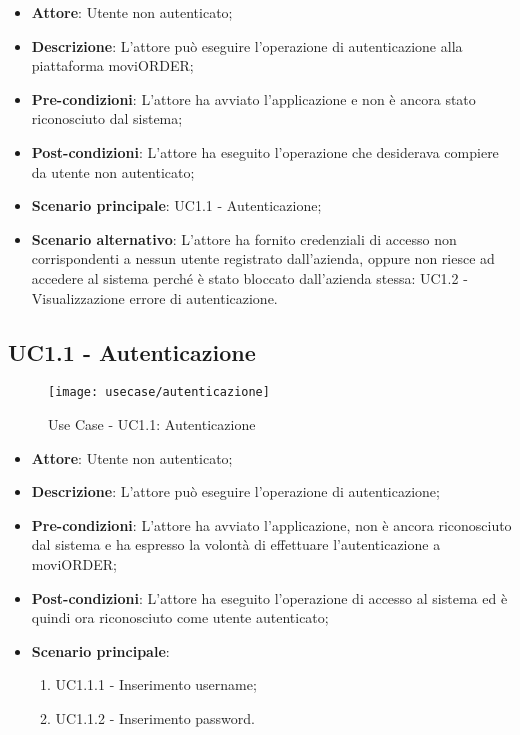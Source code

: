 \begin{itemize}
	\item \textbf{Attore}: Utente non autenticato;
	\item \textbf{Descrizione}: L'attore può eseguire l'operazione di autenticazione alla piattaforma moviORDER;
	\item \textbf{Pre-condizioni}: L'attore ha avviato l'applicazione e non è ancora stato riconosciuto dal sistema;
	\item \textbf{Post-condizioni}: L'attore ha eseguito l'operazione che desiderava compiere da utente non autenticato;
	\item \textbf{Scenario principale}: UC1.1 - Autenticazione;
	\item \textbf{Scenario alternativo}: L'attore ha fornito credenziali di accesso non corrispondenti a nessun utente registrato dall'azienda, oppure non riesce ad accedere al sistema perché è stato bloccato dall'azienda stessa: UC1.2 - Visualizzazione errore di autenticazione. 
\end{itemize}

\subsection{UC1.1 - Autenticazione}

\begin{figure}[!h] 
    \centering 
    \texttt{[image: usecase/autenticazione]} 
    \caption{Use Case - UC1.1: Autenticazione}
\end{figure}

\begin{itemize}
	\item \textbf{Attore}: Utente non autenticato;
	\item \textbf{Descrizione}: L'attore può eseguire l'operazione di autenticazione;
	\item \textbf{Pre-condizioni}: L'attore ha avviato l'applicazione, non è ancora riconosciuto dal sistema e ha espresso la volontà di eﬀettuare l’autenticazione a moviORDER;
	\item \textbf{Post-condizioni}: L'attore ha eseguito l'operazione di accesso al sistema ed è quindi ora riconosciuto come utente autenticato;
	\item \textbf{Scenario principale}: 
		\begin{enumerate}
			\item UC1.1.1 - Inserimento username;
			\item UC1.1.2 - Inserimento password.
		\end{enumerate} 
\end{itemize}

